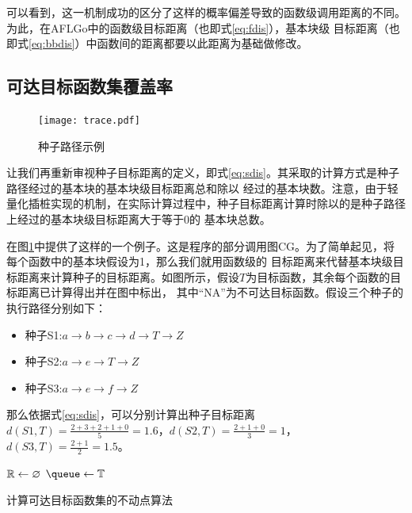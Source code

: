 \documentclass[bachelor]{njupthesis}
\begin{document}
可以看到，这一机制成功的区分了这样的概率偏差导致的函数级调用距离的不同。为此，在AFLGo中的函数级目标距离（也即式\ref{eq:fdis}），基本块级
目标距离（也即式\ref{eq:bbdis}）中函数间的距离都要以此距离为基础做修改。

\subsection{可达目标函数集覆盖率}
\begin{figure}[htb]
	\centering
	\texttt{[image: trace.pdf]}
	\caption{种子路径示例}
 	\label{pic:trace}
\end{figure}

让我们再重新审视种子目标距离的定义，即式\ref{eq:sdis}。其采取的计算方式是种子路径经过的基本块的基本块级目标距离总和除以
经过的基本块数。注意，由于轻量化插桩实现的机制，在实际计算过程中，种子目标距离计算时除以的是种子路径上经过的基本块级目标距离大于等于0的
基本块总数。

在图\ref{pic:trace}中提供了这样的一个例子。这是程序的部分调用图CG。为了简单起见，将每个函数中的基本块假设为1，那么我们就用函数级的
目标距离来代替基本块级目标距离来计算种子的目标距离。如图所示，假设$T$为目标函数，其余每个函数的目标距离已计算得出并在图中标出，
其中“NA”为不可达目标函数。假设三个种子的执行路径分别如下：
\begin{itemize}[leftmargin=36pt]
	\item 种子S1:$a \to b \to c \to d \to T \to Z$
	\item 种子S2:$a \to e \to T \to Z$
	\item 种子S3:$a \to e \to f \to Z$
\end{itemize}
那么依据式\ref{eq:sdis}，可以分别计算出种子目标距离$d(S1,T)=\frac{2+3+2+1+0}{5}=1.6$，$d(S2,T)=\frac{2+1+0}{3}=1$，
$d(S3,T)=\frac{2+1}{2}=1.5$。

\begin{algorithm}[H]
	$\mathbb{R} \gets \varnothing$\;
	$\queue \gets \targets$ \; 
	\Return{\reach}\;
	\caption[short]{计算可达目标函数集的不动点算法}\label{alg:point} 
\end{algorithm} 
\vspace{6pt}
\end{document}
